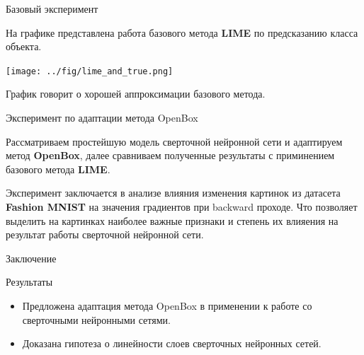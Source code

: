 \documentclass{beamer}
\begin{document}
\begin{frame}{Базовый эксперимент}

 На графике представлена работа базового метода \textbf{LIME} по предсказанию класса объекта.

 \texttt{[image: ../fig/lime\_and\_true.png]}


График говорит о хорошей аппроксимации базового метода.

\end{frame}
\begin{frame}{Эксперимент по адаптации метода OpenBox}

Рассматриваем простейшую модель сверточной нейронной сети и адаптируем метод \textbf{OpenBox}, далее сравниваем полученные результаты с приминением базового метода \textbf{LIME}. 

Эксперимент заключается в анализе влияния изменения картинок из датасета \textbf{Fashion MNIST} на значения градиентов при backward проходе. Что позволяет выделить на картинках наиболее важные признаки и степень их влияения на результат работы сверточной нейронной сети. 

\end{frame}
\begin{frame}{Заключение}
    \begin{block}{Результаты}
    \begin{itemize}
        \item Предложена адаптация метода OpenBox в применении к работе со сверточными нейронными сетями.
        \item Доказана гипотеза о линейности слоев сверточных нейронных сетей.
    \end{itemize}
    \end{block}
\end{frame}
\end{document}
